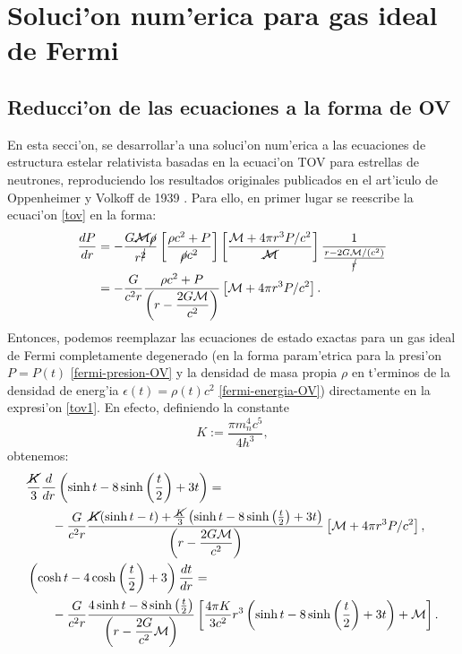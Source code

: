 \section{Soluci'on num'erica para gas ideal de Fermi}
\subsection{Reducci'on de las ecuaciones a la forma de OV}
En esta secci'on, se desarrollar'a una soluci'on num'erica a las ecuaciones de estructura estelar relativista basadas en la ecuaci'on TOV para estrellas de neutrones, reproduciendo los resultados originales publicados en el art'iculo de  Oppenheimer y Volkoff de 1939 \cite{Oppenheimer39enero}. Para ello, en primer lugar se reescribe la ecuaci'on  \eqref{tov} en la forma:
\begin{align}
\frac{dP}{dr}&=-\frac{G\cancel{\mathcal{M}}\cancel{\rho}}{r^{\cancel{2}}}\left[\frac{\rho c^2+P}{\cancel{\rho} c^2}\right]\left[ \frac{\mathcal{M}+4\pi r^3P/c^2}{\cancel{\mathcal{M}}}\right]\frac{1}{\frac{r-2G\mathcal{M}/(c^2)}{\cancel{r}}}\\
&=-\frac{G}{c^2r}\frac{\rho c^2+P}{\left(r-\dfrac{2G\mathcal{M}}{c^2}\right)}\left[\mathcal{M}+4\pi r^3P/c^2\right].\label{tov1}
\end{align}
Entonces, podemos reemplazar las ecuaciones de estado exactas para un gas ideal de Fermi completamente degenerado (en la forma param'etrica para la presi'on $P=P(t)$ \eqref{fermi-presion-OV} y la densidad de masa propia $\rho$ en t'erminos de la densidad de energ'ia $\epsilon(t)=\rho(t) c^2$ \eqref{fermi-energia-OV})  directamente en la expresi'on \eqref{tov1}. En efecto, definiendo la constante
\begin{equation}\label{fermi-rel-k}
 K:=\frac{\pi m_{n}^4 c^5}{4h^3},
\end{equation}
obtenemos:
\begin{align}
&\frac{\cancel{K}}{3}\frac{d}{dr}\left(\sinh t-8\sinh \left(\frac{t}{2}\right)+3t\right)= \nonumber \\
&\qquad -\frac{G}{c^2r}\frac{\cancel{K}(\sinh t-t)+\frac{\cancel{K}}{3}\left(\sinh t-8\sinh \left(\frac{t}{2}\right)+3t\right)}{\left(r-\dfrac{2G\mathcal{M}}{c^2}\right)}\left[\mathcal{M}+4\pi r^3P/c^2\right],\\
%
&\left(\cosh t-4\cosh \left(\frac{t}{2}\right)+3\right)\frac{dt}{dr}=\\
&\qquad -\frac{G}{c^2r}\frac{4\sinh t-8\sinh\left(\frac{t}{2}\right)}{\left(r-\dfrac{2G}{c^2}\mathcal{M}\right)}\left[\frac{4\pi K}{3c^2} r^3\left(\sinh t-8\sinh \left(\frac{t}{2}\right)+3t\right)+\mathcal{M}\right].
\end{align}

